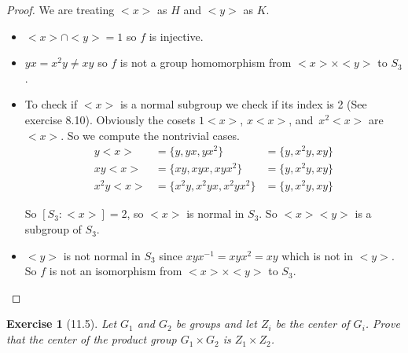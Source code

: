 \documentclass[12pt]{article}
\newtheorem*{exer}{Exercise}
\begin{document}
\begin{proof}
    We are treating $<x>$ as $H$ and $<y>$ as $K$.
    \begin{itemize}

        \item $<x> \cap <y> = {1}$ so $f$ is injective.

        \item $yx = x^2 y \neq xy$ so $f$ is not a group homomorphism
            from $<x> \times <y>$ to $S_3$.

        \item To check if $<x>$ is a normal subgroup we check if its
            index is 2 (See exercise 8.10). Obviously
            the cosets $1<x>$, $x<x>$, and~$x^2<x>$ are $<x>$. So we
            compute the nontrivial cases.
            \begin{align*}
                y<x> &= \{y, yx, yx^2\} &= \{y, x^2y, xy\} \\
                xy<x> &= \{xy, xyx, xyx^2 \} &= \{y, x^2y, xy\} \\
                x^2y<x> &= \{x^2y, x^2yx, x^2yx^2\} &= \{y, x^2y, xy\}
            \end{align*}

            So $[S_3 : <x>] = 2$, so $<x>$ is normal in $S_3$. So
            $<x><y>$ is a subgroup of $S_3$.

        \item $<y>$ is not normal in $S_3$ since $xyx^{-1} = xyx^2 = xy$
            which is not in $<y>$. So $f$ is not an isomorphism from
            $<x> \times <y>$ to $S_3$.

    \end{itemize}

\end{proof}



\begin{exer}[11.5]
Let $G_1$ and $G_2$ be groups and let $Z_i$ be the center of $G_i$.
Prove that the center of the product group $G_1 \times G_2$ is $Z_1
\times Z_2$.
\end{exer}
\end{document}
